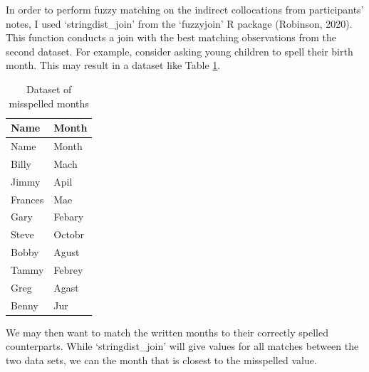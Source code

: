 \documentclass[print]{nuthesis}
\begin{document}
In order to perform fuzzy matching on the indirect collocations from participants' notes, I used `stringdist\_join' from the `fuzzyjoin' R package (Robinson, 2020).
This function conducts a join with the best matching observations from the second dataset.
For example, consider asking young children to spell their birth month.
This may result in a dataset like Table \ref{tab:months}.

\begin{longtable}[]{@{}ll@{}}
\caption{Dataset of misspelled months \label{tab:months}}\tabularnewline
\toprule\noalign{}
Name & Month \\
\midrule\noalign{}
\endfirsthead
\toprule\noalign{}
Name & Month \\
\midrule\noalign{}
\endhead
\bottomrule\noalign{}
\endlastfoot
Billy & Mach \\
Jimmy & Apil \\
Frances & Mae \\
Gary & Febary \\
Steve & Octobr \\
Bobby & Agust \\
Tammy & Febrey \\
Greg & Agast \\
Benny & Jur \\
\end{longtable}

We may then want to match the written months to their correctly spelled counterparts.
While `stringdist\_join' will give values for all matches between the two data sets, we can  the month that is closest to the misspelled value.
\end{document}
